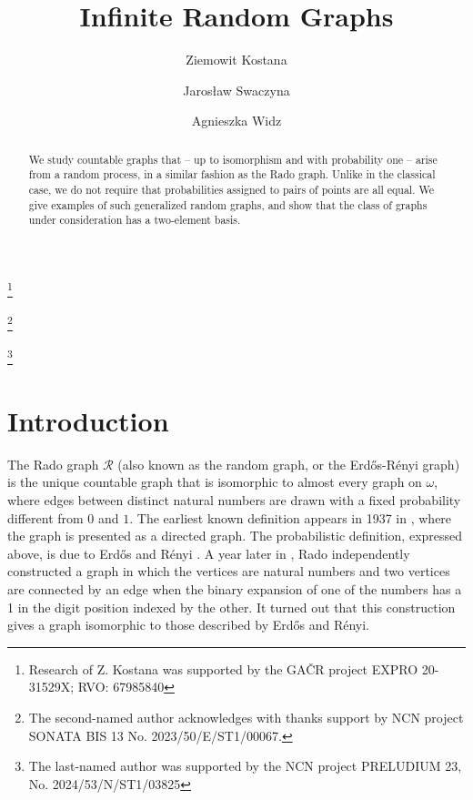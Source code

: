 \documentclass{amsart}
\theoremstyle{plain}
\theoremstyle{definition}
\theoremstyle{remark}
\numberwithin{equation}{section}
\newcommand{\RR}{\mathcal{R}}
\begin{document}
\title{Infinite Random Graphs}

\author{Ziemowit Kostana} 
\address[Z.~Kostana]{Institute of Mathematics, Czech Academy of Sciences, \v{Z}itn\'{a} 25, 115~67 Prague 1, Czech Republic \&
Faculty of Mathematics, Wroc\l aw University of Science and Technology, Wybrzeże Wyspia\'nskiego 27, 50-370 Wroc\l aw}
\thanks{Research of Z. Kostana was supported by the GA\v{C}R project EXPRO 20-31529X; RVO: 67985840}

\author{Jaros{\l}aw Swaczyna}
\address[J.~Swaczyna]{Institute of Mathematics, {\L}\'od\'z University of Technology, Aleje Politechniki 8, 93-590 {\L}\'od\'z, Poland}
\thanks{The second-named author acknowledges with thanks support by NCN project SONATA BIS 13 No. 2023/50/E/ST1/00067. }


\author{Agnieszka Widz}
\address[A.~Widz]{Institute of Mathematics, {\L}\'od\'z University of Technology, Aleje Politechniki 8, 93-590 {\L}\'od\'z, Poland}
\thanks{The last-named author was supported by the NCN project PRELUDIUM 23, No. 2024/53/N/ST1/03825}



\begin{abstract}
We study countable graphs that -- up to isomorphism and with probability one -- arise from a random process, in a similar fashion as the Rado graph. Unlike in the classical case, we do not require that probabilities assigned to pairs of points are all equal. We give examples of such generalized random graphs, and show that the class of graphs under consideration has a two-element basis.
\end{abstract}

\maketitle

\section{Introduction}\label{section Introduction}
The Rado graph $\RR$ (also known as the random graph, or the Erd\H{o}s-R\'enyi graph)
is the unique countable graph that is isomorphic to almost every graph on $\omega$, where edges between distinct natural numbers are drawn with a fixed probability
different from $0$ and $1$. The earliest known definition appears in 1937 in  \cite{Ackermann}, where the graph is presented as a directed graph. The probabilistic definition, expressed above, is due to Erd\H{o}s and R\'enyi \cite{Erdos_Reni}. A year later in \cite{Rado}, Rado independently constructed a graph in which the vertices are natural numbers and two vertices are connected by an edge when the binary expansion of one of the numbers has a 1 in the digit position indexed by the other. It turned out that this construction gives a graph isomorphic to those described by Erd\H{o}s and R\'enyi. 
\end{document}
